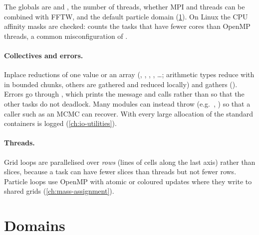 The globals are  and , the number of threads, whether MPI and threads can be combined
with FFTW, and the default particle domain (\cref{sec:par-domains}). On Linux the CPU affinity masks are checked:  counts the tasks
that have fewer cores than OpenMP threads, a common misconfiguration of .

\paragraph*{Collectives and errors.} Inplace reductions of one value or an array (, ,
, , \ldots; arithmetic types reduce with  in bounded
chunks, others are gathered and reduced locally) and gathers (). Errors go through
, which prints the message and calls  rather than  so that
the other tasks do not deadlock. Many modules can instead throw (e.g.\ ,
) so that a caller such as an MCMC can recover. With  every large
allocation of the standard containers is logged (\cref{ch:io-utilities}).

\paragraph*{Threads.} Grid loops are parallelised over \emph{rows} (lines of cells along the last axis) rather than slices,
because a task can have fewer slices than threads but not fewer rows. Particle loops use OpenMP with atomic or coloured
updates where they write to shared grids (\cref{ch:mass-assignment}).

\section{Domains}\label{sec:par-domains}

